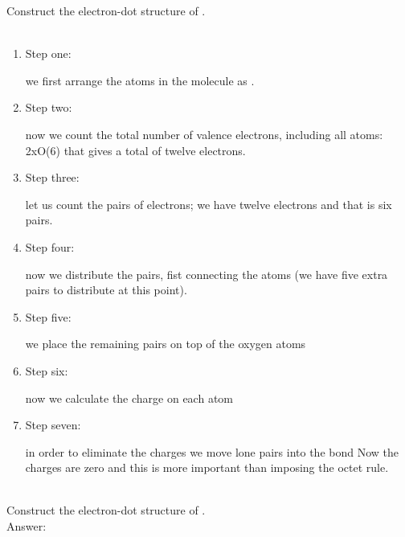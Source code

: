 \documentclass[main.tex]{subfiles}
\begin{document}
\begin{description}
\begin{example} %
Construct the electron-dot structure of .\\
\\
\begin{enumerate}[label=\protect\circled{\color{white}\arabic*}]
\item \begin{bf}Step one:\end{bf} we first arrange the atoms in the molecule as \hspace{.05in}\hspace{.05in}.
\item \begin{bf}Step two:\end{bf} now we count the total number of valence electrons, including all atoms: 2xO(6) that gives a total of twelve electrons.
 \item \begin{bf}Step three:\end{bf} let us count the pairs of electrons; we have twelve electrons and that is six pairs.
\item \begin{bf}Step four:\end{bf} now we distribute the pairs, fist connecting the atoms  (we have five extra pairs to distribute at this point).
\item \begin{bf}Step five:\end{bf} we place the remaining pairs on top of the oxygen atoms \hspace{.05in}
\item \begin{bf}Step six:\end{bf} now we calculate the charge on each atom \hspace{.05in}
\item \begin{bf}Step seven:\end{bf} in order to eliminate the charges we move lone pairs into the bond \hspace{.05in}\hspace{.05in} Now the charges are zero and this is more important than imposing the octet rule.
\end{enumerate}
\faDiamond\ \\
Construct the electron-dot structure of .\\
\flushright Answer: \hspace{.05in}
\end{example}%



\end{description}
\end{document}
